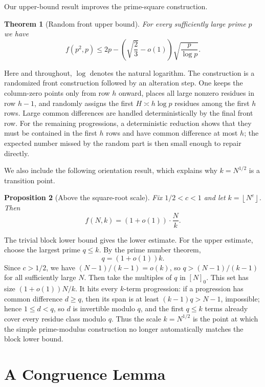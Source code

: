 \documentclass[11pt]{article}
\newtheorem{theorem}{Theorem}[section]
\newtheorem{proposition}[theorem]{Proposition}
\theoremstyle{remark}
\newcommand{\floor}[1]{\left\lfloor #1\right\rfloor}
\numberwithin{equation}{section}
\begin{document}
Our upper-bound result improves the prime-square construction.

\begin{theorem}[Random front upper bound]\label{thm:upper}
For every sufficiently large prime $p$ we have
\[
        f(p^2,p)
        \le
        2p-\left(\sqrt{\frac23}-o(1)\right)\sqrt{\frac p{\log p}}.
\]
\end{theorem}

Here and throughout, $\log$ denotes the natural logarithm.
The construction is a randomized front construction followed by an alteration step.
One keeps the column-zero points only from row $h$ onward, places all large nonzero residues in row $h-1$, and randomly assigns the first $H\asymp h\log p$ residues among the first $h$ rows.
Large common differences are handled deterministically by the final front row.
For the remaining progressions, a deterministic reduction shows that they must be contained in the first $h$ rows and have common difference at most $h$; the expected number missed by the random part is then small enough to repair directly.

We also include the following orientation result, which explains why $k= N^{1/2}$ is a transition point.

\begin{proposition}[Above the square-root scale]\label{prop:above-root}
Fix $1/2<c<1$ and let $k=\floor{N^c}$.
Then
\[
        f(N,k)=(1+o(1))\cdot\frac Nk.
\]
\end{proposition}

The trivial block lower bound gives the lower estimate.
For the upper estimate, choose the largest prime $q\le k$.
By the prime number theorem,
\[
        q=(1+o(1))k.
\]
Since $c>1/2$, we have $(N-1)/(k-1)=o(k)$, so $q>(N-1)/(k-1)$ for all sufficiently large $N$.
Then take the multiples of $q$ in $[N]_0$.
This set has size $(1+o(1))N/k$.
It hits every $k$-term progression: if a progression has common difference $d\ge q$, then its span is at least $(k-1)q>N-1$, impossible; hence $1\le d<q$, so $d$ is invertible modulo $q$, and the first $q\le k$ terms already cover every residue class modulo $q$.
Thus the scale $k=N^{1/2}$ is the point at which the simple prime-modulus construction no longer automatically matches the block lower bound.

\section{A Congruence Lemma}
\end{document}
